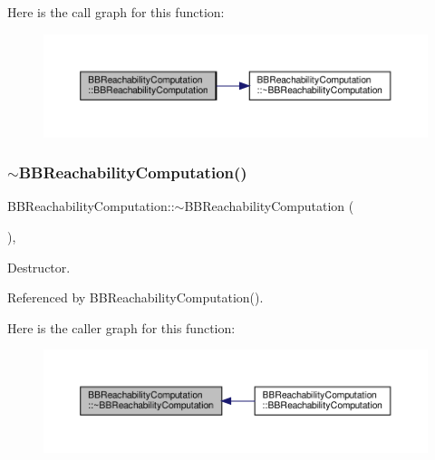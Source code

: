 Here is the call graph for this function\+:
\nopagebreak
\begin{figure}[H]
\begin{center}
\leavevmode
\includegraphics[width=350pt]{d4/dce/classBBReachabilityComputation_a8bbcad478656b3c0c32e561f1e9b9536_cgraph}
\end{center}
\end{figure}
\mbox{\label{classBBReachabilityComputation_a160c7619898ba1b10f9b27e9c7e81e87}} 
\subsubsection{\texorpdfstring{$\sim$\+B\+B\+Reachability\+Computation()}{~BBReachabilityComputation()}}
{\footnotesize\ttfamily B\+B\+Reachability\+Computation\+::$\sim$\+B\+B\+Reachability\+Computation (\begin{DoxyParamCaption}{ }\end{DoxyParamCaption})\hspace{0.3cm}{\ttfamily [override]}, {\ttfamily [default]}}



Destructor. 



Referenced by B\+B\+Reachability\+Computation().

Here is the caller graph for this function\+:
\nopagebreak
\begin{figure}[H]
\begin{center}
\leavevmode
\includegraphics[width=350pt]{d4/dce/classBBReachabilityComputation_a160c7619898ba1b10f9b27e9c7e81e87_icgraph}
\end{center}
\end{figure}


